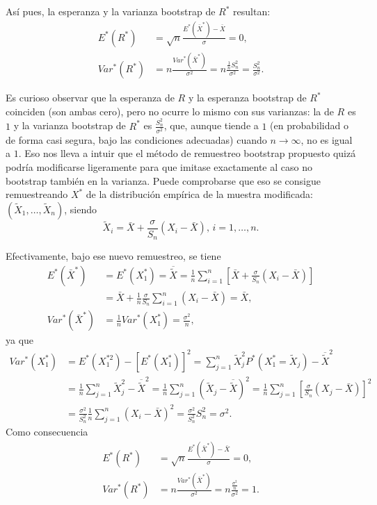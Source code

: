 \documentclass[]{book}
\theoremstyle{definition}
\theoremstyle{definition}
\theoremstyle{definition}
\theoremstyle{remark}
\begin{document}
Así pues, la esperanza y la varianza bootstrap de \(R^{\ast}\) resultan:
\[\begin{aligned}
E^{\ast}\left( R^{\ast} \right) &= \sqrt{n}\frac{E^{\ast}\left( \bar{X}^{\ast} \right) -\bar{X}}{\sigma }=0, \\
Var^{\ast}\left( R^{\ast} \right) &= n\frac{Var^{\ast}\left( \bar{X}^{\ast} \right)}{\sigma^2}=n\frac{\frac{1}{n}S_n^2}{\sigma^2}=
\frac{S_n^2}{\sigma^2}.
\end{aligned}\]

Es curioso observar que la esperanza de \(R\) y la esperanza bootstrap
de \(R^{\ast}\) coinciden (son ambas cero), pero no ocurre lo mismo con
sus varianzas: la de \(R\) es \(1\) y la varianza bootstrap de
\(R^{\ast}\) es \(\frac{S_n^2}{\sigma^2}\), que, aunque tiende a \(1\)
(en probabilidad o de forma casi segura, bajo las condiciones adecuadas)
cuando \(n\rightarrow \infty\), no es igual a \(1\). Eso nos lleva a
intuir que el método de remuestreo bootstrap propuesto quizá podría
modificarse ligeramente para que imitase exactamente al caso no
bootstrap también en la varianza. Puede comprobarse que eso se consigue
remuestreando \(X^{\ast}\) de la distribución empírica de la muestra
modificada: \(\left( \tilde{X}_1,\ldots ,\tilde{X}_n \right)\), siendo
\[\tilde{X}_i=\bar{X}+\frac{\sigma }{S_n}\left( X_i-\bar{X}
 \right) \text{, }i=1,\ldots ,n.\]

Efectivamente, bajo ese nuevo remuestreo, se tiene \[\begin{aligned}
E^{\ast}\left( \bar{X}^{\ast} \right) &= E^{\ast}\left( X_1^{\ast
} \right) =\overline{\tilde{X}}=\frac{1}{n}\sum_{i=1}^{n}\left[ \bar{X}+
\frac{\sigma }{S_n}\left( X_i-\bar{X} \right) \right] \\
&= \bar{X}+\frac{1}{n}\frac{\sigma }{S_n}\sum_{i=1}^{n}\left( X_i-
\bar{X} \right) =\bar{X}, \\
Var^{\ast}\left( \bar{X}^{\ast} \right) &= \frac{1}{n}Var^{\ast
}\left( X_1^{\ast} \right) =\frac{\sigma^2}{n},
\end{aligned}\] ya que \[\begin{aligned}
Var^{\ast}\left( X_1^{\ast} \right) &= E^{\ast}\left( X_1^{\ast
2} \right) -\left[ E^{\ast}\left( X_1^{\ast} \right) \right]
^2=\sum_{j=1}^{n}\tilde{X}_j^2P^{\ast}\left( X_1^{\ast}=\tilde{X}
_j \right) -\overline{\tilde{X}}^2 \\
&= \frac{1}{n}\sum_{j=1}^{n}\tilde{X}_j^2-\overline{\tilde{X}}^2=\frac{
1}{n}\sum_{j=1}^{n}\left( \tilde{X}_j-\overline{\tilde{X}} \right)^2=
\frac{1}{n}\sum_{j=1}^{n}\left[ \frac{\sigma }{S_n}\left( X_j-\bar{X} \right) \right]^2 \\
&= \frac{\sigma^2}{S_n^2}\frac{1}{n}\sum_{j=1}^{n}\left( X_i-
\bar{X} \right)^2=\frac{\sigma^2}{S_n^2}S_n^2=\sigma^2.
\end{aligned}\] Como consecuencia \[\begin{aligned}
E^{\ast}\left( R^{\ast} \right) &= \sqrt{n}\frac{E^{\ast}\left( 
\bar{X}^{\ast} \right) -\bar{X}}{\sigma }=0, \\
Var^{\ast}\left( R^{\ast} \right) &= n\frac{Var^{\ast}\left( 
\bar{X}^{\ast} \right)}{\sigma^2}=n\frac{\frac{\sigma^2}{n}}{\sigma^2}
=1.
\end{aligned}\]
\end{document}
